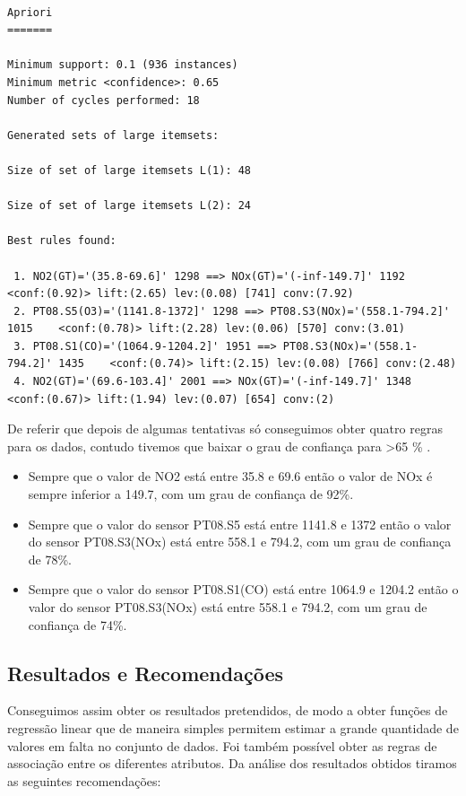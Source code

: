 \newpage
\begin{lstlisting}[breaklines,frame=single]

Apriori
=======

Minimum support: 0.1 (936 instances)
Minimum metric <confidence>: 0.65
Number of cycles performed: 18

Generated sets of large itemsets:

Size of set of large itemsets L(1): 48

Size of set of large itemsets L(2): 24

Best rules found:

 1. NO2(GT)='(35.8-69.6]' 1298 ==> NOx(GT)='(-inf-149.7]' 1192    <conf:(0.92)> lift:(2.65) lev:(0.08) [741] conv:(7.92)
 2. PT08.S5(O3)='(1141.8-1372]' 1298 ==> PT08.S3(NOx)='(558.1-794.2]' 1015    <conf:(0.78)> lift:(2.28) lev:(0.06) [570] conv:(3.01)
 3. PT08.S1(CO)='(1064.9-1204.2]' 1951 ==> PT08.S3(NOx)='(558.1-794.2]' 1435    <conf:(0.74)> lift:(2.15) lev:(0.08) [766] conv:(2.48)
 4. NO2(GT)='(69.6-103.4]' 2001 ==> NOx(GT)='(-inf-149.7]' 1348    <conf:(0.67)> lift:(1.94) lev:(0.07) [654] conv:(2)

\end{lstlisting}
De referir que depois de algumas tentativas só conseguimos obter quatro regras para os dados, contudo tivemos que baixar o grau de confiança para \textgreater 65 \% .

\begin{itemize}
	\item Sempre que o valor de NO2 está entre 35.8 e 69.6 então o valor de NOx é sempre inferior a 149.7, com um grau de confiança de 92\%. 
	\item Sempre que o valor do sensor PT08.S5 está entre 1141.8 e 1372 então o valor do sensor PT08.S3(NOx) está entre 558.1 e 794.2, com um grau de confiança de 78\%.
	\item Sempre que o valor do sensor PT08.S1(CO) está entre 1064.9 e 1204.2 então o valor do sensor PT08.S3(NOx) está entre 558.1 e 794.2, com um grau de confiança de 74\%.
\end{itemize}

\subsection{Resultados e Recomendações}


Conseguimos assim obter os resultados pretendidos, de modo a obter funções de regressão linear que de maneira simples permitem estimar a grande quantidade de valores em falta no conjunto de dados. Foi também possível obter as regras de associação entre os diferentes atributos.
Da análise dos resultados obtidos tiramos as seguintes recomendações:

